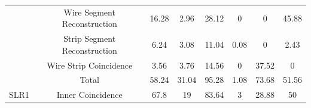 \begin{table}[]
\begin{tabular}{|c|c|c|c|c|c|c|c|}
                                                                                & Wire Segment Reconstruction  & 16.28                                                     & 2.96                                                      & 28.12                                                    & 0                                                                 & 0                                                      & 45.88                                                  \\ \cline{2-8} 
                                                                                & Strip Segment Reconstruction & 6.24                                                      & 3.08                                                      & 11.04                                                    & 0.08                                                              & 0                                                      & 2.43                                                   \\ \cline{2-8} 
                                                                                & Wire Strip Coincidence       & 3.56                                                      & 3.76                                                      & 14.56                                                    & 0                                                                 & 37.52                                                  & 0                                                      \\ \cline{2-8} 
                                                                                & Total                        & 58.24                                                     & 31.04                                                     & 95.28                                                    & 1.08                                                              & 73.68                                                  & 51.56                                                  \\ \hline\hline
    \multirow{3}{*}{SLR1}                                                       & Inner Coincidence            & 67.8                                                      & 19                                                        & 83.64                                                    & 3                                                                 & 28.88                                                  & 50                                                     \\ \cline{2-8} 

\end{tabular}
\end{table}
